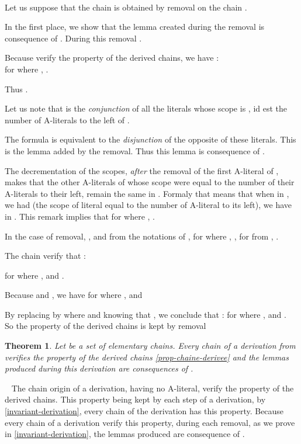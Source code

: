 \documentclass{article}
\newtheorem{theoreme}{Theorem}\newtheorem{lemme}[theoreme]{Lemma}
\newenvironment{preuve}{\noindent {\em Proof :}\ }{{\hfill
    }\vspace{.5pc}} \newcommand{\sg}{\!\!<\!\!}
\begin{document}
\begin{preuve}
\begin{itemrond}
\item Let us suppose that the chain  is obtained by removal on the chain .

In the first place, we show that the lemma created during the removal is consequence of .
During this removal .

Because  verify the property of the derived chains, we have : \\for  where , 
.

Thus . 

Let us note that  is the \emph{conjunction}  of all the literals  whose scope is , id est the
number of A-literals to the left of .

The formula  is equivalent to the \emph{disjunction} of the opposite of these literals.
This is the lemma added by the removal. Thus this lemma is consequence of .

The decrementation of the scopes, \emph{after} the removal of the first A-literal of , makes that the other A-literals of  
whose scope were equal to the number of their A-literals to their left, remain the same in . 
Formaly that means that when in , we had  (the scope of literal  equal to the number of A-literal to its left), 
we have  in . This remark implies that  for  where , .
 
In the case of removal, ,  and from the notations of , 
for  where , , for  from , . 

The chain  verify that : 

for  where ,  and .

Because  and , we have 
for  where ,  and 

By replacing  by  where  and knowing that , we conclude that :
for  where ,  and .\\
So the property of the derived chains is kept by removal
\end{itemrond}
\end{preuve}


\begin{theoreme}
Let  be a set of elementary chains. Every chain of a derivation from  verifies the property of the derived chains
\ref{prop-chaine-derivee} and the lemmas produced during this derivation are consequences of .
\end{theoreme}

\begin{preuve}
The chain origin of a derivation, having no A-literal, verify the property of the derived chains.
This property being kept by each step of a derivation, by \ref{invariant-derivation}, every chain of the derivation has this 
property. Because every chain of a derivation verify this property, during each removal, 
as we prove in \ref{invariant-derivation}, the lemmas produced are consequence of . 
\end{preuve}
\end{document}
